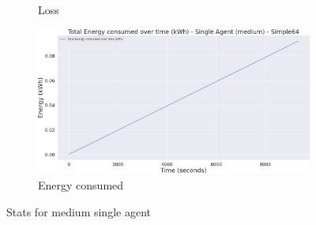 \begin{figure}[h]
\begin{subfigure}[b]{0.495\textwidth}
        \caption{Loss}
    \end{subfigure}
    \begin{subfigure}[b]{0.495\textwidth}
        \includegraphics[width=1\textwidth]{figs/single_dqn_m_130/energy_consumed.png}
        \caption{Energy consumed}
    \end{subfigure}
    \caption{Stats for medium single agent}
\end{figure}

